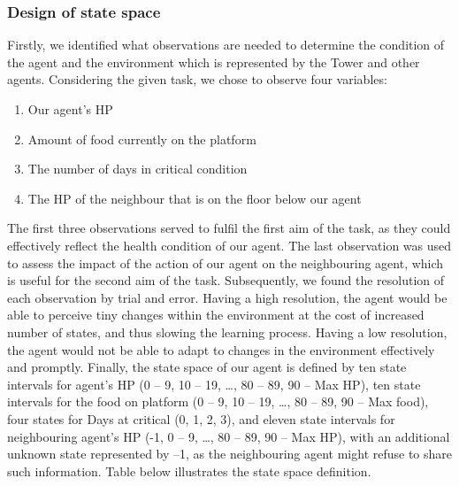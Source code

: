 \subsubsection{Design of state space}
Firstly, we identified what observations are needed to determine the condition of the agent and the environment which is represented by the Tower and other agents. Considering the given task, we chose to observe four variables: 
\begin{enumerate}
    \item Our agent's HP
    \item Amount of food currently on the platform
    \item The number of days in critical condition
    \item The HP of the neighbour that is on the floor below our agent
\end{enumerate}

The first three observations served to fulfil the first aim of the task, as they could effectively reflect the health condition of our agent. The last observation was used to assess the impact of the action of our agent on the neighbouring agent, which is useful for the second aim of the task. Subsequently, we found the resolution of each observation by trial and error. Having a high resolution, the agent would be able to perceive tiny changes within the environment at the cost of increased number of states, and thus slowing the learning process. Having a low resolution, the agent would not be able to adapt to changes in the environment effectively and promptly. Finally, the state space of our agent is defined by ten state intervals for agent’s HP (0 – 9, 10 – 19, …, 80 – 89, 90 – Max HP), ten state intervals for the food on platform (0 – 9, 10 – 19, …, 80 – 89, 90 – Max food), four states for Days at critical (0, 1, 2, 3), and eleven state intervals for neighbouring agent’s HP (-1, 0 – 9, …, 80 – 89, 90 – Max HP), with an additional unknown state represented by –1, as the neighbouring agent might refuse to share such information. Table below illustrates the state space definition.

